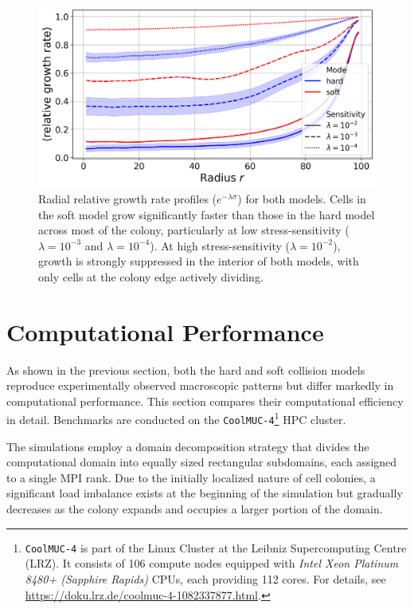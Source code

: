 \documentclass[conference]{IEEEtran}
\begin{document}
\begin{figure}[H]
    \centering
    \includegraphics[width=\linewidth]{figures/comparison_plots/combined_radial_impedance.png}
    \caption{Radial relative growth rate profiles ($e^{-\lambda \sigma}$) for both models. Cells in the soft model grow significantly faster than those in the hard model across most of the colony, particularly at low stress-sensitivity ($\lambda = 10^{-3}$ and $\lambda = 10^{-4}$). At high stress-sensitivity ($\lambda = 10^{-2}$), growth is strongly suppressed in the interior of both models, with only cells at the colony edge actively dividing.}
    \label{fig:radial_distribution_growth_rate}
\end{figure}

\section{Computational Performance}
\label{sec:performance_analysis}

As shown in the previous section, both the hard and soft collision models reproduce experimentally observed macroscopic patterns but differ markedly in computational performance. This section compares their computational efficiency in detail. Benchmarks are conducted on the \texttt{CoolMUC-4}\footnote{\texttt{CoolMUC-4} is part of the Linux Cluster at the Leibniz Supercomputing Centre (LRZ). It consists of 106 compute nodes equipped with \textit{Intel Xeon Platinum 8480+ (Sapphire Rapids)} CPUs, each providing 112 cores. For details, see \url{https://doku.lrz.de/coolmuc-4-1082337877.html}.} HPC cluster.

The simulations employ a domain decomposition strategy that divides the computational domain into equally sized rectangular subdomains, each assigned to a single MPI rank. Due to the initially localized nature of cell colonies, a significant load imbalance exists at the beginning of the simulation but gradually decreases as the colony expands and occupies a larger portion of the domain.
\end{document}
